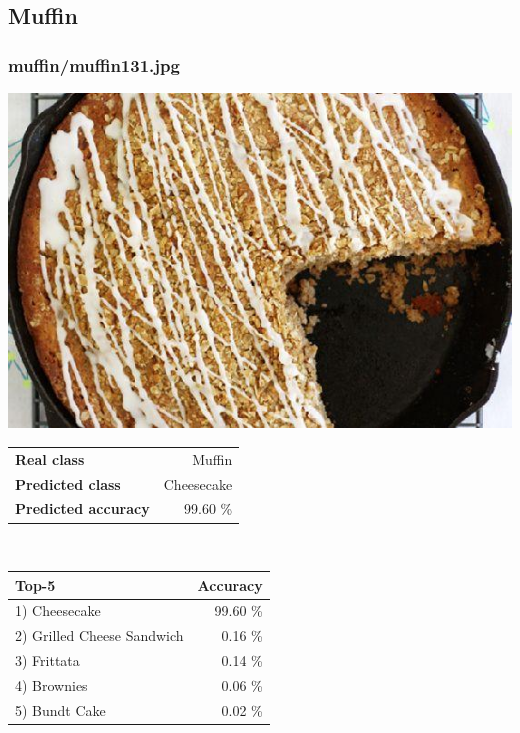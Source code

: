 \subsection{Muffin}
    
\subsubsection{muffin/muffin131.jpg}

\begin{minipage}[t]{0.4\textwidth}
	\vspace{0pt}
	\includegraphics[width=\linewidth]{images/evaluation-images/muffin/muffin131.jpg}
\end{minipage}
\hfill
\begin{minipage}[t]{0.5\textwidth}
	\vspace{0pt}\raggedright
	\begin{tabularx}{\textwidth}{X r}
		\small \textbf{Real class} & \small Muffin\\
		\small \textbf{Predicted class} & \small Cheesecake\\
		\small \textbf{Predicted accuracy} & \small 99.60 \%
    \end{tabularx}\\
    
    \vspace{6pt}
	\begin{tabularx}{\textwidth}{X r}
        \small \textbf{Top-5} & \small \textbf{Accuracy} \\
        \hline
		\small 1) Cheesecake & \small 99.60 \%\\\small 2) Grilled Cheese Sandwich & \small 0.16 \%\\\small 3) Frittata & \small 0.14 \%\\\small 4) Brownies & \small 0.06 \%\\\small 5) Bundt Cake & \small 0.02 \%
    \end{tabularx}
\end{minipage}
    
